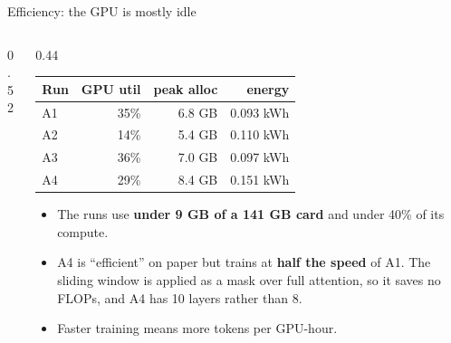 \documentclass[aspectratio=169,11pt]{beamer}
\begin{document}
\begin{frame}{Efficiency: the GPU is mostly idle}
  \begin{columns}[c]
    \begin{column}{0.52\textwidth}
    \end{column}
    \begin{column}{0.44\textwidth}
      \small
      \begin{tabular}{@{}lrrr@{}}
        \toprule
        Run & GPU util & peak alloc & energy\\
        \midrule
        A1 & 35\% & 6.8 GB & 0.093 kWh\\
        A2 & 14\% & 5.4 GB & 0.110 kWh\\
        A3 & 36\% & 7.0 GB & 0.097 kWh\\
        A4 & 29\% & 8.4 GB & 0.151 kWh\\
        \bottomrule
      \end{tabular}
      \vspace{2mm}
      \begin{itemize}
        \item The runs use \textbf{under 9 GB of a 141 GB card} and under 40\% of its compute.
        \item A4 is ``efficient'' on paper but trains at \textbf{half the speed} of A1. The sliding window is applied as a mask over full attention, so it saves no FLOPs, and A4 has 10 layers rather than 8.
        \item Faster training means more tokens per GPU-hour.
      \end{itemize}
    \end{column}
  \end{columns}
\end{frame}
\end{document}
